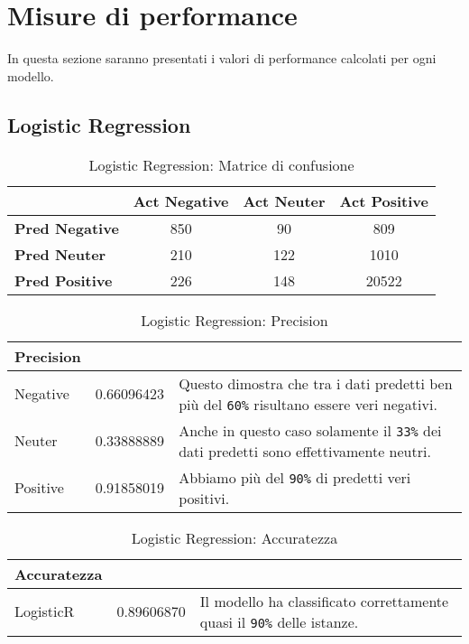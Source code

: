 \chapter{Misure di performance}
\label{cap:Misure}
	In questa sezione saranno presentati i valori di performance calcolati per ogni modello.
	
	\section{Logistic Regression}
		\begin{table} [H]
			\caption{Logistic Regression: Matrice di confusione}
			\label{tab:matriceConfusioneLogisticRegression}
			\centering
			\begin{tabular}{lccc}
				\toprule 
				& \textbf{Act Negative} & \textbf{Act Neuter}	& \textbf{Act Positive}\\
				\midrule
				\textbf{Pred Negative}  & 850 & 90 & 809\\
				\textbf{Pred Neuter} & 210 & 122 & 1010\\
				\textbf{Pred Positive} & 226 & 148 & 20522\\
				\bottomrule
			\end{tabular}
		\end{table}
	
		
		\begin{table} [H]
			\caption{Logistic Regression: Precision}
			\label{tab:precisionLogisticRegression}
			\centering
			\begin{tabular}{llp{}}
				\toprule 
				\textbf{Precision}	\\
				\midrule
				Negative & 0.66096423 & Questo dimostra che tra i dati predetti ben più del \verb|60%| risultano essere veri negativi.\\
				Neuter & 0.33888889 & Anche in questo caso solamente il \verb|33%| dei dati predetti sono effettivamente neutri.\\
				Positive & 0.91858019 & Abbiamo più del \verb|90%| di predetti veri positivi.\\
				\bottomrule
			\end{tabular}
		\end{table}
	
		\begin{table} [H]
			\caption{Logistic Regression: Accuratezza}
			\label{tab:accLogisticRegression}
			\centering
			\begin{tabular}{llp{}}
				\toprule 
				\textbf{Accuratezza}	\\
				\midrule
				LogisticR & 0.89606870 & Il modello ha classificato correttamente quasi il \verb|90%| delle istanze.\\
				\bottomrule
			\end{tabular}
		\end{table}
	
